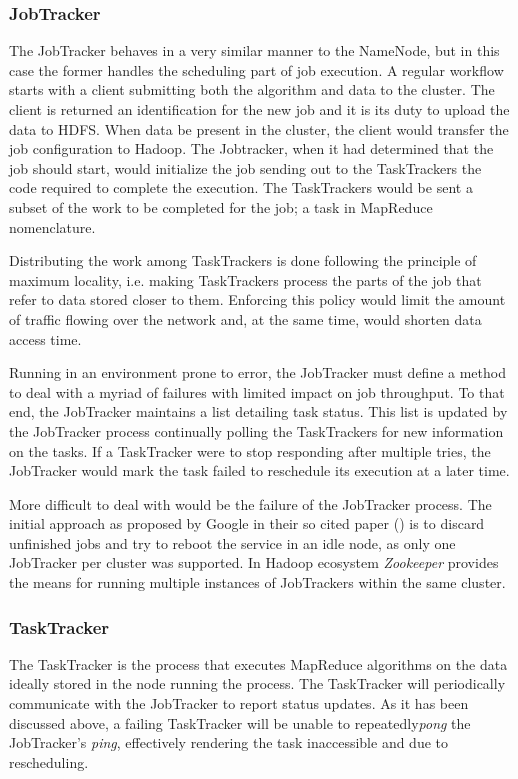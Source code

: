 \subsubsection{JobTracker}\label{subsubsec:jobtracker}
\noindent The JobTracker behaves in a very similar manner to the NameNode, but in this case the former handles the scheduling part of job execution. A regular workflow starts with a client submitting both the algorithm and data to the cluster. The client is returned an identification for the new job and it is its duty to upload the data to HDFS. When data be present in the cluster, the client would transfer the job configuration to Hadoop. The Jobtracker, when it had determined that the job should start, would initialize the job sending out to the TaskTrackers the code required to complete the execution. The TaskTrackers would be sent a subset of the work to be completed for the job; a task in MapReduce nomenclature.

Distributing the work among TaskTrackers is done following the principle of maximum locality, i.e. making TaskTrackers process the parts of the job that refer to data stored closer to them. Enforcing this policy would limit the amount of traffic flowing over the network and, at the same time, would shorten data access time.

Running in an environment prone to error, the JobTracker must define a method to deal with a myriad of failures with limited impact on job throughput. To that end, the JobTracker maintains a list detailing task status. This list is updated by the JobTracker process continually polling the TaskTrackers for new information on the tasks. If a TaskTracker were to stop responding after multiple tries, the JobTracker would mark the task failed to reschedule its execution at a later time.

More difficult to deal with would be the failure of the JobTracker process. The initial approach as proposed by Google in their so cited paper (\cite{googlemapreduce}) is to discard unfinished jobs and try to reboot the service in an idle node, as only one JobTracker per cluster was supported. In Hadoop ecosystem \emph{Zookeeper} provides the means for running multiple instances of JobTrackers within the same cluster.

\subsubsection{TaskTracker}\label{subsubsec:tasktracker}
\noindent The TaskTracker is the process that executes MapReduce algorithms on the data ideally stored in the node running the process. The TaskTracker will periodically communicate with the JobTracker to report status updates. As it has been discussed above, a failing TaskTracker will be unable to repeatedly\emph{pong} the JobTracker's \emph{ping}, effectively rendering the task inaccessible and due to rescheduling.
